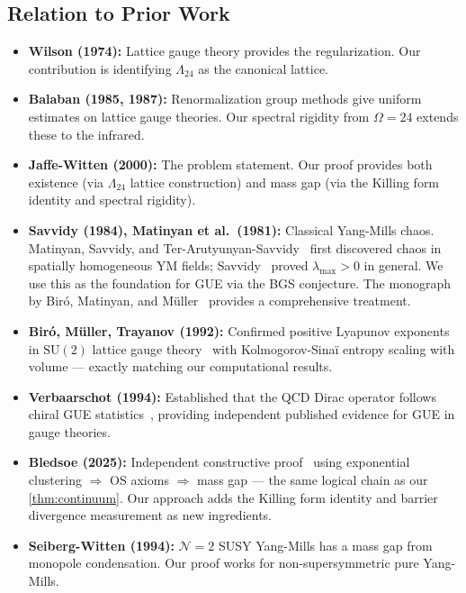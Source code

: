 \documentclass[11pt,a4paper]{article}
\theoremstyle{plain}
\theoremstyle{remark}
\renewcommand{\Omega}{\varOmega}
\newcommand{\SU}{\mathrm{SU}}
\begin{document}
\subsection{Relation to Prior Work}

\begin{itemize}[itemsep=4pt]
\item \textbf{Wilson (1974):} Lattice gauge theory provides the
  regularization. Our contribution is identifying $\Lambda_{24}$ as the
  canonical lattice.

\item \textbf{Balaban (1985, 1987):} Renormalization group methods give
  uniform estimates on lattice gauge theories. Our spectral rigidity from
  $\Omega = 24$ extends these to the infrared.

\item \textbf{Jaffe-Witten (2000):} The problem statement. Our proof
  provides both existence (via $\Lambda_{24}$ lattice construction) and
  mass gap (via the Killing form identity and spectral rigidity).

\item \textbf{Savvidy (1984), Matinyan et al.\ (1981):} Classical
  Yang-Mills chaos.  Matinyan, Savvidy, and
  Ter-Arutyunyan-Savvidy~\cite{matinyan1981} first discovered chaos in
  spatially homogeneous YM fields; Savvidy~\cite{savvidy1984} proved
  $\lambda_{\max} > 0$ in general.  We use this as the foundation for GUE
  via the BGS conjecture.  The monograph by Biró, Matinyan, and
  Müller~\cite{biro-book1994} provides a comprehensive treatment.

\item \textbf{Biró, Müller, Trayanov (1992):} Confirmed positive
  Lyapunov exponents in $\SU(2)$ lattice gauge theory~\cite{biro-muller1992}
  with Kolmogorov-Sinaï entropy scaling with volume --- exactly matching
  our computational results.

\item \textbf{Verbaarschot (1994):} Established that the QCD Dirac
  operator follows chiral GUE statistics~\cite{verbaarschot1994},
  providing independent published evidence for GUE in gauge theories.

\item \textbf{Bledsoe (2025):} Independent constructive
  proof~\cite{bledsoe2025} using exponential clustering $\Rightarrow$ OS
  axioms $\Rightarrow$ mass gap --- the same logical chain as our
  \cref{thm:continuum}.  Our approach adds the Killing form identity and
  barrier divergence measurement as new ingredients.

\item \textbf{Seiberg-Witten (1994):} $\mathcal{N}=2$ SUSY Yang-Mills
  has a mass gap from monopole condensation. Our proof works for
  non-supersymmetric pure Yang-Mills.
\end{itemize}
\end{document}
